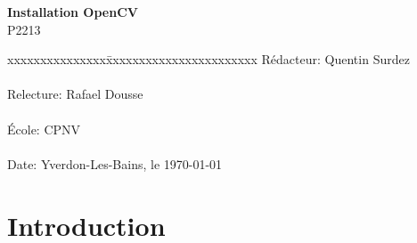 \documentclass[
	a4paper,									%
	11pt,										%
	twoside,									%
	openright,									%
	notitlepage,									%
	parskip=half,								%
]{scrreprt}										%
\begin{document}
\begin{titlepage}
	\vspace{3cm}

	\fontsize{30pt}{32pt}\selectfont 
	\noindent \textbf{Installation OpenCV} \\

	\fontsize{18pt}{20pt}\selectfont\vspace{0.3em} P2213 \\

	\vspace{4cm}
	\fontsize{12pt}{15pt}\selectfont
	\begin{tabbing}
		xxxxxxxxxxxxxxx\=xxxxxxxxxxxxxxxxxxxxxxx \kill
		Rédacteur:\> Quentin Surdez\\ \\
		Relecture:\> Rafael Dousse\\ \\
		École:\> CPNV\\ \\
		Date:\> Yverdon-Les-Bains, le \today \\
	\end{tabbing}
\end{titlepage}

\tableofcontents

\cleardoublepage

\setcounter{page}{1}

\chapter{Introduction}
\end{document}
